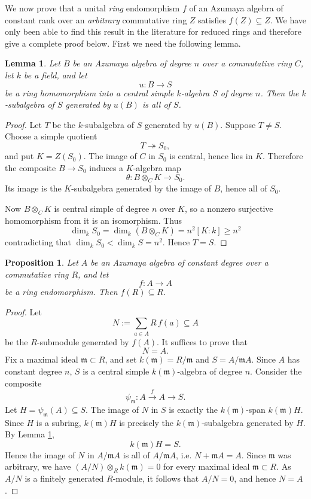 \documentclass[a4paper,11pt,reqno]{amsart}%
\newtheorem{lemma}[theorem]{Lemma}
\newtheorem{proposition}[theorem]{Proposition}
\theoremstyle{definition}
\newcommand{\<}{\<}
\renewcommand{\>}{\>}
\numberwithin{equation}{subsection}
\begin{document}
We now prove that a unital \emph{ring} endomorphism $f$ of an Azumaya algebra of constant rank over an \emph{arbitrary} commutative ring $Z$ satisfies 
$f(Z)\subseteq Z$. We have only been able to find this result in the literature for reduced rings and therefore give a complete proof below. 
First we need the following lemma.


\begin{lemma}\label{lemma:CSA}
Let $B$ be an Azumaya algebra of degree $n$ over a commutative ring $C$, let $k$ be a field, and let
$$
u:B\to S
$$
be a ring homomorphism into a central simple $k$-algebra $S$ of degree $n$. Then the $k$-subalgebra of $S$ generated by $u(B)$ is all of $S$.
\end{lemma}

\begin{proof}
Let $T$ be the $k$-subalgebra of $S$ generated by $u(B)$. Suppose $T\neq S$. Choose a simple quotient
$$
T\twoheadrightarrow S_0,
$$
and put $K=Z(S_0)$. The image of $C$ in $S_0$ is central, hence lies in $K$. Therefore the composite
$
B\to S_0
$
induces a $K$-algebra map
$$
\theta:B\otimes_C K\to S_0.
$$
Its image is the $K$-subalgebra generated by the image of $B$, hence all of $S_0$. 

Now $B\otimes_C K$ is central simple of degree $n$ over $K$, so a nonzero surjective homomorphism from it is an isomorphism. Thus
$$
\dim_k S_0=\dim_k(B\otimes_C K)=n^2[K:k]\ge n^2
$$
contradicting that $
\dim_k S_0<\dim_k S=n^2.
$
Hence $T=S$.
\end{proof}

\begin{proposition}\label{proposition:Azumaya}
Let $A$ be an Azumaya algebra of constant degree over a commutative ring $R$, and let
$$
f:A\to A
$$
be a ring endomorphism. Then $f(R)\subseteq R$.
\end{proposition}

\begin{proof}
Let
$$
N:=\sum_{a\in A} R\,f(a)\subseteq A
$$
be the $R$-submodule generated by $f(A)$. It suffices to prove that
$$
N=A.
$$
Fix a maximal ideal $\mathfrak m\subset R$, and set
$k(\mathfrak m)=R/\mathfrak m$ and  $S=A/\mathfrak m A$.
Since $A$ has constant degree $n$, $S$ is a central simple $k(\mathfrak m)$-algebra of degree $n$.
Consider the composite
$$
\psi_{\mathfrak m}:A\xrightarrow{f}A\to S.
$$
Let $H=\psi_{\mathfrak m}(A)\subseteq S$. The image of $N$ in $S$ is exactly the $k(\mathfrak m)$-span $k(\mathfrak m)H$. Since $H$ is a subring, 
$k(\mathfrak m)H$ is precisely the $k(\mathfrak m)$-subalgebra generated by $H$. By Lemma \ref{lemma:CSA},
$$
k(\mathfrak m)H=S.
$$
Hence the image of $N$ in $A/\mathfrak m A$ is all of $A/\mathfrak m A$, i.e.
$
N+\mathfrak m A=A.
$
Since $\mathfrak m$ was arbitrary, we have $(A/N)\otimes_R k(\mathfrak m)=0$ for every maximal ideal $\mathfrak m\subset R$.
As $A/N$ is a finitely generated $R$-module, it follows that $A/N=0$, and hence $N=A$.
\end{proof}
\end{document}
